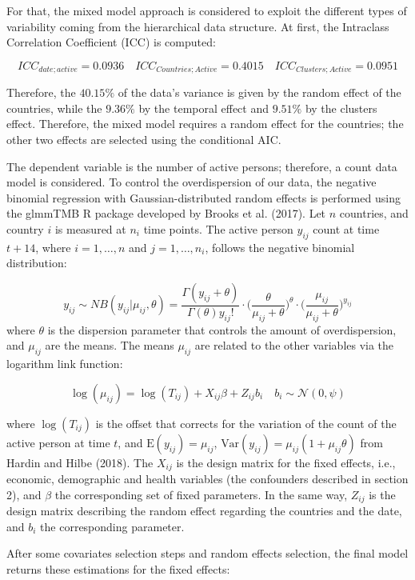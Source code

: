 \documentclass[
  6pt,
]{article}
\begin{document}
For that, the mixed model approach is considered to exploit the
different types of variability coming from the hierarchical data
structure. At first, the Intraclass Correlation Coefficient (ICC) is
computed:

\[
ICC_{date; active} = 0.0936 \quad ICC_{Countries; Active} = 0.4015 \quad ICC_{Clusters; Active} = 0.0951 
\]

Therefore, the \(40.15\%\) of the data's variance is given by the random
effect of the countries, while the \(9.36\%\) by the temporal effect and
\(9.51\%\) by the clusters effect. Therefore, the mixed model requires a
random effect for the countries; the other two effects are selected
using the conditional AIC.

The dependent variable is the number of active persons; therefore, a
count data model is considered. To control the overdispersion of our
data, the negative binomial regression with Gaussian-distributed random
effects is performed using the glmmTMB R package developed by Brooks et
al. (2017). Let \(n\) countries, and country \(i\) is measured at
\(n_i\) time points. The active person \(y_{ij}\) count at time
\(t+14\), where \(i=1,\dots, n\) and \(j = 1, \dots,n_i\), follows the
negative binomial distribution:

\[y_{ij} \sim NB(y_{ij}|\mu_{ij}, \theta) = \dfrac{\Gamma(y_{ij}+ \theta)}{\Gamma(\theta) y_{ij}!} \cdot \Big(\dfrac{\theta}{\mu_{ij} + \theta}\Big)^{\theta}\cdot \Big(\dfrac{\mu_{ij}}{\mu_{ij} + \theta}\Big)^{y_{ij}}\]
where \(\theta\) is the dispersion parameter that controls the amount of
overdispersion, and \(\mu_{ij}\) are the means. The means \(\mu_{ij}\)
are related to the other variables via the logarithm link function:

\[\log(\mu_{ij}) = \log(T_{ij}) + X_{ij} \beta + Z_{ij} b_i \quad b_i \sim \mathcal{N}(0,\psi)\]

where \(\log(T_{ij})\) is the offset that corrects for the variation of
the count of the active person at time \(t\), and
\(\text{E}(y_{ij}) = \mu_{ij}\),
\(\text{Var}(y_{ij}) = \mu_{ij} (1 + \mu_{ij}\theta)\) from Hardin and
Hilbe (2018). The \(X_{ij}\) is the design matrix for the fixed effects,
i.e., economic, demographic and health variables (the confounders
described in section 2), and \(\beta\) the corresponding set of fixed
parameters. In the same way, \(Z_{ij}\) is the design matrix describing
the random effect regarding the countries and the date, and \(b_i\) the
corresponding parameter.

After some covariates selection steps and random effects selection, the
final model returns these estimations for the fixed effects:
\end{document}
